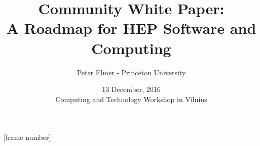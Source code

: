 \documentclass{beamer}
\title{Community White Paper: \\
       A Roadmap for HEP Software and Computing}
\author{Peter Elmer - Princeton University}
\date{13 December, 2016 \\ Computing and Technology Workshop in Vilnius}
\begin{document}
\maketitle

%
%

[frame number]

%



%



%
%






%



%
%





%






%












%
\end{document}
